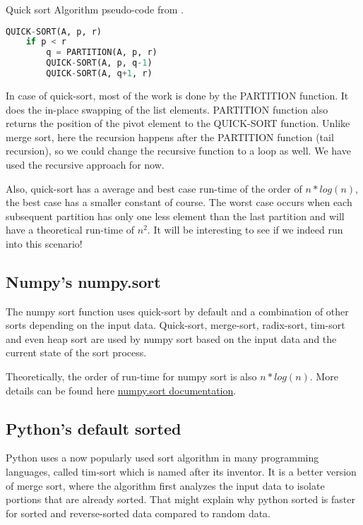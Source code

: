 \documentclass[sigconf, nonacm, natbib, screen, balance=False]{acmart}
\begin{document}
\begin{listing}
  \caption{Quick sort Algorithm pseudo-code from \citet[Ch.~2.3.1]{CLRS_2009}.}
  \label{lst:quick_algo}
\begin{lstlisting}[language=Python]
QUICK-SORT(A, p, r)
    if p < r
        q = PARTITION(A, p, r)
        QUICK-SORT(A, p, q-1)
        QUICK-SORT(A, q+1, r)
\end{lstlisting}
\end{listing}

In case of quick-sort, most of the work is done by the PARTITION function. It does the in-place swapping of the list elements. PARTITION function also returns the position of the pivot element to the QUICK-SORT function. Unlike merge sort, here the recursion happens after the PARTITION function (tail recursion), so we could change the recursive function to a loop as well. We have used the recursive approach for now.

Also, quick-sort has a average and best case run-time of the order of $n*log(n)$, the best case has a smaller constant of course. The worst case occurs when each subsequent partition has only one less element than the last partition and will have a theoretical run-time of $n^2$. It will be interesting to see if we indeed run into this scenario!

\subsection{Numpy's numpy.sort}\label{sec:numpy sort}
The numpy sort function uses quick-sort by default and a combination of other sorts depending on the input data. Quick-sort, merge-sort, radix-sort, tim-sort and even heap sort are used by numpy sort based on the input data and the current state of the sort process.

Theoretically, the order of run-time for numpy sort is also $n*log(n)$. More details can be found here \citet{NumpySortDocumentation} \href{https://docs.scipy.org/doc/numpy/reference/generated/numpy.sort.html}{numpy.sort documentation}. 

\subsection{Python's default sorted}\label{sec:sorted sort}
Python uses a now popularly used sort algorithm in many programming languages, called tim-sort which is named after its
inventor. It is a better version of merge sort, where the algorithm first analyzes the input data to isolate portions that are already sorted. That might explain why python sorted is faster for sorted and reverse-sorted data compared to random data. 
\end{document}
